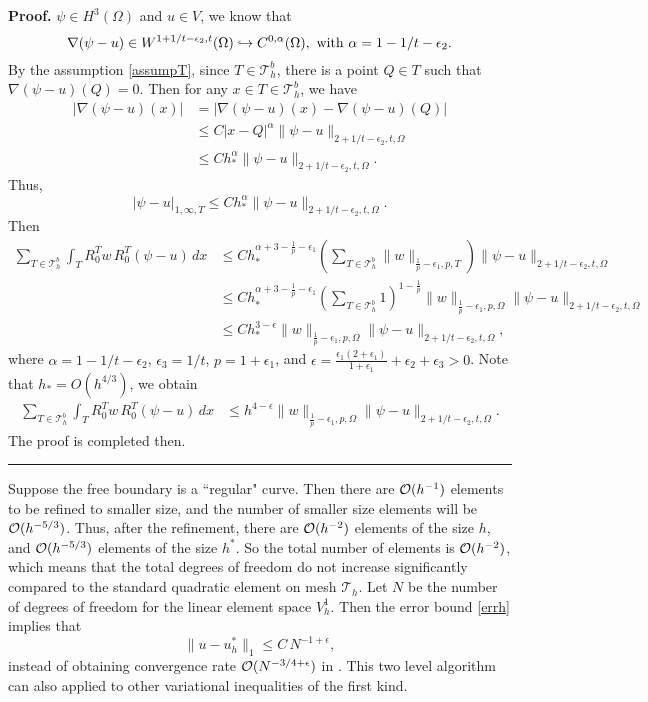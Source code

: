\documentclass[12pt]{article}
\newenvironment{proof}[1][Proof]{\textbf{#1.} }
{\ \rule{0.75em}{0.75em}\smallskip}
\begin{document}
\begin{proof}
$\psi \in H^3(\Omega)$ and $u\in V$, we know that 
\[\nabla(\psi-u) \in W^{1+1/t-\epsilon_2,t}(\Omega)
\hookrightarrow C^{0,\alpha}(\Omega),\ {\rm with}\ \alpha = 1-1/t-\epsilon_2.\] 
By the assumption \eqref{assumpT}, since $T \in \mathcal{T}_h^b$, there is 
a point $Q\in T$ such that $\nabla(\psi -u)(Q) = 0$. Then for any $x\in T\in \mathcal{T}_h^b$, 
we have
\begin{align*}
|\nabla(\psi-u)(x)|& =|\nabla(\psi-u)(x)-\nabla(\psi - u)(Q)|\\
  &\leq  C |x-Q|^\alpha\|\psi-u\|_{2+1/t-\epsilon_2,t,\Omega} \\
  &\leq C h_*^\alpha\|\psi-u\|_{2+1/t-\epsilon_2,t,\Omega}. 
\end{align*}
Thus,
\[ |\psi -u|_{1,\infty,T}\leq C h_*^\alpha \|\psi-u\|_{2+1/t-\epsilon_2,t,\Omega}.\]
Then
\begin{align*}
\sum_{T\in \mathcal{T}_h^b}  \int_T R^T_0 w \, R^T_0(\psi - u) \,dx 
&\leq C h_*^{\alpha+3-\frac{1}{p}-\epsilon_1}
\left(\sum_{T\in \mathcal{T}_h^b}\|w\|_{\frac{1}{p}-\epsilon_1,p,T}\right) \|\psi-u\|_{2+1/t-\epsilon_2,t,\Omega}\\
&\leq  C h_*^{\alpha+3-\frac{1}{p}-\epsilon_1} \left(\sum_{T\in \mathcal{T}_h^b} 1\right)^{1-\frac{1}{p}} 
 \|w\|_{\frac{1}{p}-\epsilon_1,p,\Omega} \|\psi-u\|_{2+1/t-\epsilon_2,t,\Omega} \\
&\leq C h_*^{3-\epsilon} \|w\|_{\frac{1}{p}-\epsilon_1,p,\Omega} \|\psi-u\|_{2+1/t-\epsilon_2,t,\Omega} ,
\end{align*}
where $\alpha = 1-1/t-\epsilon_2$, $\epsilon_3 = 1/t$, $p=1+\epsilon_1$, and 
$\epsilon=\frac{\epsilon_1(2+\epsilon_1)}{1+\epsilon_1} + \epsilon_2+ \epsilon_3>0$.
Note that $h_*=O(h^{4/3})$, we obtain
\begin{align*}
\sum_{T\in \mathcal{T}_h^b}  \int_T R^T_0 w \, R^T_0(\psi - u) \,dx 
&\leq h^{4-\epsilon} \|w\|_{\frac{1}{p}-\epsilon_1,p,\Omega} \|\psi-u\|_{2+1/t-\epsilon_2,t,\Omega} .
\end{align*}
The proof is completed then.
\end{proof}

Suppose the free boundary is a ``regular" curve.  Then there are ${\cal O}(h^{-1})$
elements to be refined to smaller size, and the number of smaller size elements
will be ${\cal O}(h^{-5/3})$.  Thus, after the refinement, there are ${\cal O}(h^{-2})$ 
elements of the size $h$, and ${\cal O}(h^{-5/3})$ elements of the size $h^*$.
So the total number of elements is ${\cal O}(h^{-2})$, which means that the total degrees of
freedom do not increase significantly compared to the standard quadratic element on mesh 
$\mathcal{T}_h$. Let $N$ be the number of degrees of freedom for the linear element 
space $V_h^1$.  Then the error bound \eqref{errh} implies that
\[ \|u-u_h^*\|_1 \leq C \, N^{-1+\epsilon}, \]
instead of obtaining convergence rate ${\cal O}(N^{-3/4+\epsilon})$ in \cite{wang02}. This two level
algorithm can also applied to other variational inequalities of the first kind.
\end{document}
